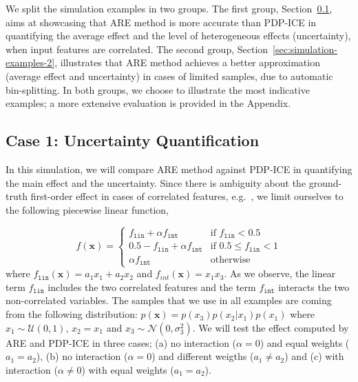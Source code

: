 \documentclass[twoside]{article}
\begin{document}
We split the simulation examples in two groups. The first group,
Section~\ref{sec:simulation-examples-1}, aims at showcasing that ARE
method is more accurate than PDP-ICE in quantifying the average effect
and the level of heterogeneous effects (uncertainty), when input
features are correlated. The second group,
Section~\ref{sec:simulation-examples-2}, illustrates that ARE method
achieves a better approximation (average effect and uncertainty) in
cases of limited samples, due to automatic bin-splitting. In both
groups, we choose to illustrate the most indicative examples; a more
extensive evaluation is provided in the Appendix.

\subsection{Case 1: Uncertainty Quantification}
\label{sec:simulation-examples-1}

In this simulation, we will compare ARE method against PDP-ICE in
quantifying the main effect and the uncertainty. Since there is
ambiguity about the ground-truth first-order effect in cases of
correlated features,
e.g.~\citep{apley2020visualizing,Gromping2020MAEP}, we limit ourselves
to the following piecewise linear function,

\begin{equation}
  \label{eq:synth-ex-1-function}
  f(\mathbf{x}) = \begin{cases}
                    f_{\mathtt{lin}} + \alpha f_{\mathtt{int}} & \text{if $f_{\mathtt{lin}} < 0.5$ }\\
                    0.5 - f_{\mathtt{lin}} + \alpha f_{\mathtt{int}} & \text{if $0.5 \leq f_{\mathtt{lin}} < 1$}\\
                    \alpha f_{\mathtt{int}} &\text{otherwise}
                  \end{cases}
\end{equation}
%
where \(f_{\mathtt{lin}}(\mathbf{x}) = a_1 x_1 + a_2 x_2\) and
\(f_{int}(\mathbf{x}) = x_1x_3\). As we observe, the linear term
\(f_{\mathtt{lin}}\) includes the two correlated features and the term
\(f_{\mathtt{int}}\) interacts the two non-correlated variables. The
samples that we use in all examples are coming from the following
distribution: \(p(\mathbf{x}) = p(x_3)p(x_2|x_1)p(x_1)\) where
\(x_1 \sim \mathcal{U}(0,1)\), \(x_2 = x_1\) and
\(x_3 \sim \mathcal{N}(0, \sigma_3^2)\). We will test the effect
computed by ARE and PDP-ICE in three cases; (a) no interaction
(\(\alpha=0\)) and equal weights (\(a_1=a_2\)), (b) no interaction
(\(\alpha=0\)) and different weigths (\( a_1 \neq a_2 \)) and (c) with
interaction (\(\alpha \neq 0\)) with equal weights (\(a_1=a_2\)).
\end{document}
